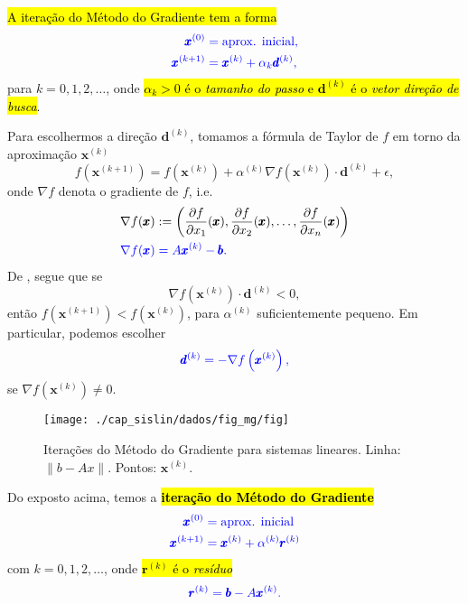 \hl{A iteração do Método do Gradiente tem a forma}
\begin{equation}\color{blue}\begin{aligned}
    \pmb{x}^{(0)} &= \text{aprox. inicial},\\
    \pmb{x}^{(k+1)} &= \pmb{x}^{(k)} + \alpha_k\pmb{d}^{(k)},
  \end{aligned}
\end{equation}
para $k=0, 1, 2, \ldots$, onde \hl{$\alpha_k>0$ é o \emph{tamanho do passo} e $\pmb{d}^{(k)}$ é o \emph{vetor direção de busca}}.

Para escolhermos a direção $\pmb{d}^{(k)}$, tomamos a fórmula de Taylor de $f$ em torno da aproximação $\pmb{x}^{(k)}$
\begin{equation}\label{cap_sislin_sec_metg:eq:metg_taylor}
  f\left(\pmb{x}^{(k+1)}\right) = f\left(\pmb{x}^{(k)}\right) + \alpha^{(k)}\nabla f\left(\pmb{x}^{(k)}\right)\cdot \pmb{d}^{(k)} + \epsilon,
\end{equation}
onde $\nabla f$ denota o gradiente de $f$, i.e.
\begin{align}
  \nabla f(\pmb{x}) &:= \left(\frac{\partial f}{\partial x_1}(\pmb{x}), \frac{\partial f}{\partial x_2}(\pmb{x}), \dotsc, \frac{\partial f}{\partial x_n}(\pmb{x})\right)\\
  \color{blue}\nabla f(\pmb{x}) &\color{blue}= A\pmb{x}^{(k)}-\pmb{b}.
\end{align}
De \label{cap_sislin_sec_metg:eq:metg_taylor}, segue que se
\begin{equation}
  \nabla f\left(\pmb{x}^{(k)}\right)\cdot \pmb{d}^{(k)} < 0,
\end{equation}
então $f\left(\pmb{x}^{(k+1)}\right) < f\left(\pmb{x}^{(k)}\right)$, para $\alpha^{(k)}$ suficientemente pequeno. Em particular, podemos escolher
\begin{equation}\color{blue}\pmb{d}^{(k)} = -\nabla f\left(\pmb{x}^{(k)}\right),
\end{equation}
se $\nabla f(\pmb{x}^{(k)})\neq 0$.


\begin{figure}[H]
  \centering
  \texttt{[image: ./cap\_sislin/dados/fig\_mg/fig]}
  \caption{Iterações do Método do Gradiente para sistemas lineares. Linha: $\|b-Ax\|$. Pontos: $\pmb{x}^{(k)}$.}
  \label{cap_sislin_sec_metg:fig:cap_sislin_sec_mg}
\end{figure}

Do exposto acima, temos a \hl{\textbf{iteração do Método do Gradiente}}
\begin{equation}\color{blue}\begin{aligned}
    \pmb{x}^{(0)} &= \text{aprox. inicial}\\
    \pmb{x}^{(k+1)} &= \pmb{x}^{(k)} + \alpha^{(k)}\pmb{r}^{(k)}
  \end{aligned}
\end{equation}
com $k = 0, 1, 2, \ldots$, onde \hl{$\pmb{r}^{(k)}$ é o \emph{resíduo}}
\begin{equation}\color{blue}\pmb{r}^{(k)} = \pmb{b} - A\pmb{x}^{(k)}.
\end{equation}

